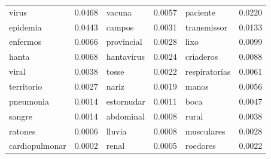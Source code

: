 \documentclass[conference]{IEEEtran}
\begin{document}
\begin{table}[t]
\begin{center}
\begin{tabular}{|lr|lr|lr|}
virus & 0.0468 & vacuna & 0.0057 & paciente & 0.0220 \\
epidemia & 0.0443 & campos & 0.0031 & transmissor & 0.0133 \\
enfermos & 0.0066& provincial & 0.0028  & lixo &0.0099 \\
hanta & 0.0068 & hantavirus & 0.0024  & criaderos & 0.0088\\
viral & 0.0038 & tosse & 0.0022 & respiratorias & 0.0061 \\
territorio & 0.0027 & nariz & 0.0019 & manos & 0.0056 \\
pneumonia & 0.0014 & estornudar & 0.0011 & boca & 0.0047 \\
sangre & 0.0014 & abdominal & 0.0008 & rural & 0.0038 \\
ratones & 0.0006 & lluvia & 0.0008 & musculares & 0.0028 \\
cardiopulmonar & 0.0002 & renal & 0.0005 & roedores & 0.0022 \\
\hline
\end{tabular}
\label{tab:hanta_topics}
\end{center}
\vspace{-10pt}
\end{table}
\end{document}
